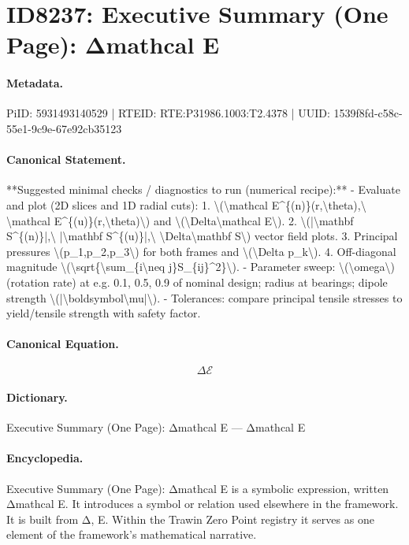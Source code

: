 \section*{ID8237: Executive Summary (One Page): Δmathcal E}
\paragraph{Metadata.}
PiID: 5931493140529 | RTEID: RTE:P31986.1003:T2.4378 | UUID: 1539f8fd-c58c-55e1-9c9e-67e92cb35123

\paragraph{Canonical Statement.}
**Suggested minimal checks / diagnostics to run (numerical recipe):** - Evaluate and plot (2D slices and 1D radial cuts): 1. \textbackslash{}(\textbackslash{}mathcal E\textasciicircum{}\{(n)\}(r,\textbackslash{}theta),\textbackslash{} \textbackslash{}mathcal E\textasciicircum{}\{(u)\}(r,\textbackslash{}theta)\textbackslash{}) and \textbackslash{}(\textbackslash{}Delta\textbackslash{}mathcal E\textbackslash{}). 2. \textbackslash{}(|\textbackslash{}mathbf S\textasciicircum{}\{(n)\}|,\textbackslash{} |\textbackslash{}mathbf S\textasciicircum{}\{(u)\}|,\textbackslash{} \textbackslash{}Delta\textbackslash{}mathbf S\textbackslash{}) vector field plots. 3. Principal pressures \textbackslash{}(p\_1,p\_2,p\_3\textbackslash{}) for both frames and \textbackslash{}(\textbackslash{}Delta p\_k\textbackslash{}). 4. Off-diagonal magnitude \textbackslash{}(\textbackslash{}sqrt\{\textbackslash{}sum\_\{i\textbackslash{}neq j\}S\_\{ij\}\textasciicircum{}2\}\textbackslash{}). - Parameter sweep: \textbackslash{}(\textbackslash{}omega\textbackslash{}) (rotation rate) at e.g. 0.1, 0.5, 0.9 of nominal design; radius at bearings; dipole strength \textbackslash{}(|\textbackslash{}boldsymbol\textbackslash{}mu|\textbackslash{}). - Tolerances: compare principal tensile stresses to yield/tensile strength with safety factor.

\paragraph{Canonical Equation.}
\[
\Delta\mathcal E
\]

\paragraph{Dictionary.}
Executive Summary (One Page): Δmathcal E — Δmathcal E

\paragraph{Encyclopedia.}
Executive Summary (One Page): Δmathcal E is a symbolic expression, written Δmathcal E. It introduces a symbol or relation used elsewhere in the framework. It is built from Δ, E. Within the Trawin Zero Point registry it serves as one element of the framework's mathematical narrative.
